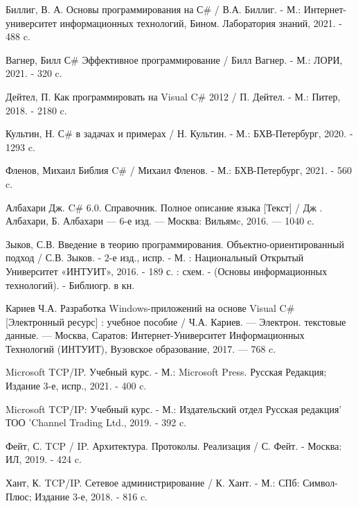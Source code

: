\newsection
{}

\begin{thebibliography}{21}
    Биллиг, В. А. Основы программирования на С\# / В.А. Биллиг. - М.: Интернет-университет информационных технологий, Бином. Лаборатория знаний, 2021. - 488 c.
    
    Вагнер, Билл С\# Эффективное программирование / Билл Вагнер. - М.: ЛОРИ, 2021. - 320 c.
    
    Дейтел, П. Как программировать на Visual C\# 2012 / П. Дейтел. - М.: Питер, 2018. - 2180 c.
    
    Культин, Н. С\# в задачах и примерах / Н. Культин. - М.: БХВ-Петербург, 2020. - 1293 c.
    
    Фленов, Михаил Библия C\# / Михаил Фленов. - М.: БХВ-Петербург, 2021. - 560 c.
    
    Албахари Дж. C\# 6.0. Справочник. Полное описание языка [Текст] / Дж . Албахари, Б. Албахари — 6-е изд. — Москва: Вильямc, 2016. — 1040 c.
    
    Зыков, С.В. Введение в теорию программирования. Объектно-ориентированный подход / С.В. Зыков. - 2-е изд., испр. - М. : Национальный Открытый Университет «ИНТУИТ», 2016. - 189 с. : схем. - (Основы информационных технологий). - Библиогр. в кн.
    
    Кариев Ч.А. Разработка Windows-приложений на основе Visual C\# [Электронный ресурс] : учебное пособие / Ч.А. Кариев. — Электрон. текстовые данные. — Москва, Саратов: Интернет-Университет Информационных Технологий (ИНТУИТ), Вузовское образование, 2017. — 768 c.
    
    Microsoft TCP/IP. Учебный курс. - М.: Microsoft Press. Русская Редакция; Издание 3-е, испр., 2021. - 400 c.
    
    Microsoft TCP/IP: Учебный курс. - М.: Издательский отдел Русская редакция' ТОО 'Channel Trading Ltd., 2019. - 392 c.
    
    Фейт, С. TCP / IP. Архитектура. Протоколы. Реализация / С. Фейт. - Москва: ИЛ, 2019. - 424 c.
    
    Хант, К. TCP/IP. Сетевое администрирование / К. Хант. - М.: СПб: Символ-Плюс; Издание 3-е, 2018. - 816 c.
    

\end{thebibliography}
